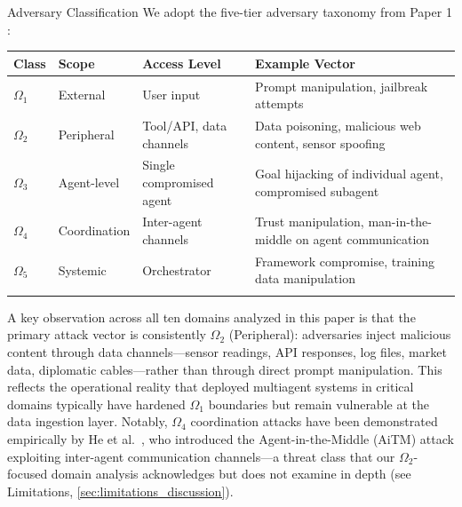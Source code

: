 \documentclass[
  ignorenonframetext,
]{beamer}
\newcounter{none} %
\begin{document}
\begin{frame}[allowframebreaks]{Adversary Classification}
\protect{}\label{adversary-classification}
We adopt the five-tier adversary taxonomy from Paper 1
\cite{friedman2026cogsec1}:

{\def\LTcaptype{none} %
\begin{longtable}[]{@{}
  >{\raggedright\arraybackslash}p{}
  >{\raggedright\arraybackslash}p{}
  >{\raggedright\arraybackslash}p{}
  >{\raggedright\arraybackslash}p{}@{}}
\toprule\noalign{}
\begin{minipage}[b]{\linewidth}\raggedright
Class
\end{minipage} & \begin{minipage}[b]{\linewidth}\raggedright
Scope
\end{minipage} & \begin{minipage}[b]{\linewidth}\raggedright
Access Level
\end{minipage} & \begin{minipage}[b]{\linewidth}\raggedright
Example Vector
\end{minipage} \\
\midrule\noalign{}
\endhead
\(\Omega_1\) & External & User input & Prompt manipulation, jailbreak
attempts \\
\(\Omega_2\) & Peripheral & Tool/API, data channels & Data poisoning,
malicious web content, sensor spoofing \\
\(\Omega_3\) & Agent-level & Single compromised agent & Goal hijacking
of individual agent, compromised subagent \\
\(\Omega_4\) & Coordination & Inter-agent channels & Trust manipulation,
man-in-the-middle on agent communication \\
\(\Omega_5\) & Systemic & Orchestrator & Framework compromise, training
data manipulation \\
\bottomrule\noalign{}
\end{longtable}
}

A key observation across all ten domains analyzed in this paper is that
the primary attack vector is consistently \(\Omega_2\) (Peripheral):
adversaries inject malicious content through data channels---sensor
readings, API responses, log files, market data, diplomatic
cables---rather than through direct prompt manipulation. This reflects
the operational reality that deployed multiagent systems in critical
domains typically have hardened \(\Omega_1\) boundaries but remain
vulnerable at the data ingestion layer. Notably, \(\Omega_4\)
coordination attacks have been demonstrated empirically by He et
al.~\cite{he2025redteaming}, who introduced the Agent-in-the-Middle
(AiTM) attack exploiting inter-agent communication channels---a threat
class that our \(\Omega_2\)-focused domain analysis acknowledges but
does not examine in depth (see Limitations,
\cref{sec:limitations_discussion}).
\end{frame}
\end{document}
